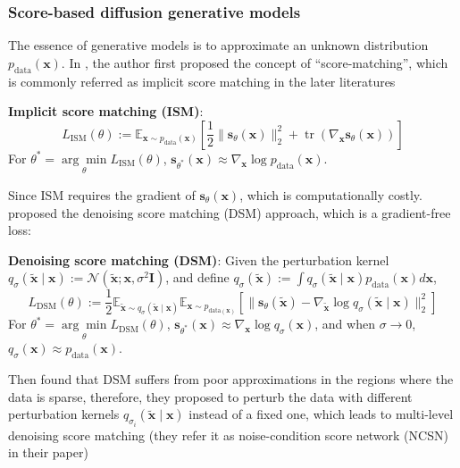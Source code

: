 \documentclass{article}
\newcommand{\x}{\mathbf{x}}
\newcommand{\s}{\mathbf{s}}
\newcommand{\I}{\mathbf{I}}
\begin{document}
\subsubsection{Score-based diffusion generative models}
The essence of generative models is to approximate an unknown distribution $p_{\text{data}}(\x)$. In \cite{hyvarinen2005estimation}, the author first proposed the concept of ``score-matching'', which is commonly referred as implicit score matching in the later literatures
\begin{proposition}
    \textbf{Implicit score matching (ISM)}:
    \begin{equation} 
        L_{\text{ISM}}(\theta) := \mathbb{E}_{\x\sim p_{\text{data}}(\x)}\left[\frac{1}{2}\|\s_{\theta}(\x)\|^2_2 + \operatorname{tr}(\nabla_\x \s_{\theta}(\x)) \right] 
    \end{equation}
    For $\theta^* = \underset{\theta}{\arg\min} L_{\text{ISM}}(\theta)$, $\s_{\theta^*}(\x)\approx \nabla_\x\log p_{\text{data}}(\x)$.
\end{proposition}
Since ISM requires the gradient of $\s_{\theta}(\x)$, which is computationally costly. \cite{vincent2011connection} proposed the denoising score matching (DSM) approach, which is a gradient-free loss:
\begin{proposition}
    \textbf{Denoising score matching (DSM)}: Given the perturbation kernel $q_{\sigma}(\tilde{\x}\mid\x):=\mathcal{N}(\tilde{\x};\x,\sigma^2\I)$, and define $q_{\sigma}(\tilde{\x}):= \int q_{\sigma}(\tilde{\x}\mid\x)p_{\text{data}}(\x)d\x$,
    \begin{equation}
        L_{\text{DSM}}(\theta) := \frac{1}{2}\mathbb{E}_{\tilde{\x}\sim q_{\sigma}(\tilde{\x}\mid \x)} \mathbb{E}_{\x\sim p_{\text{data}(\x)}}\left[\| \s_{\theta}(\tilde{\x}) - \nabla_{\tilde{\x}}\log q_{\sigma}(\tilde{\x}\mid \x) \|^2_2\right] 
    \end{equation}
    For $\theta^* = \underset{\theta}{\arg\min} L_{\text{DSM}}(\theta)$, $\s_{\theta^*}(\x)\approx \nabla_\x\log q_{\sigma}(\x)$, and when $\sigma\to 0$, $q_{\sigma}(\x)\approx p_{\text{data}}(\x)$.
\end{proposition}
Then \cite{song2019generative} found that DSM suffers from poor approximations in the regions where the data is sparse, therefore, they proposed to perturb the data with different perturbation kernels $q_{\sigma_i}(\tilde{\x}\mid \x)$ instead of a fixed one, which leads to multi-level denoising score matching (they refer it as noise-condition score network (NCSN) in their paper)
\end{document}
